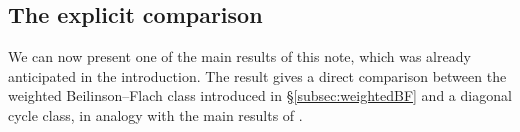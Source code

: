 \documentclass[a4paper,11pt]{amsart}
\theoremstyle{plain}
\theoremstyle{definition}
\theoremstyle{remark}
\newcommand{\res}{\mathrm{res}}
\numberwithin{equation}{section}
\begin{document}
\subsection{The explicit comparison}\label{subsec:explicit_comparison}

We can now present one of the main results of this note, which was already anticipated in the introduction. The result gives a direct comparison between the weighted Beilinson--Flach class introduced in \S\ref{subsec:weightedBF} and a diagonal cycle class, in analogy with the main results of \cite{LR1}. 

\end{document}
